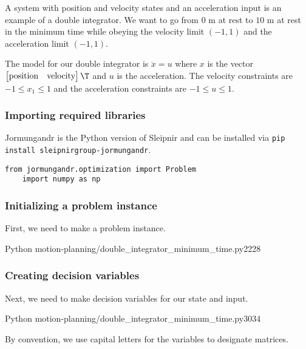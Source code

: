 A system with position and velocity states and an acceleration input is an
example of a double integrator. We want to go from $0$ m at rest to $10$ m at
rest in the minimum time while obeying the velocity limit $(-1, 1)$ and the
acceleration limit $(-1, 1)$.

The model for our double integrator is $\ddot{x} = u$ where $x$ is the vector
$\begin{bmatrix}\text{position} & \text{velocity}\end{bmatrix}\T$ and $u$ is the
acceleration. The velocity constraints are $-1 \leq x_1 \leq 1$ and the
acceleration constraints are $-1 \leq u \leq 1$.

\subsubsection{Importing required libraries}

Jormungandr is the Python version of Sleipnir and can be installed via
\texttt{pip install sleipnirgroup-jormungandr}.
\begin{code}
  \begin{lstlisting}[style=customPython]
    from jormungandr.optimization import Problem
    import numpy as np
  \end{lstlisting}
\end{code}

\subsubsection{Initializing a problem instance}

First, we need to make a problem instance.
\begin{coderemotesubset}{Python}
  {motion-planning/double_integrator_minimum_time.py}{22}{28}
\end{coderemotesubset}

\subsubsection{Creating decision variables}

Next, we need to make decision variables for our state and input.
\begin{coderemotesubset}{Python}
  {motion-planning/double_integrator_minimum_time.py}{30}{34}
\end{coderemotesubset}

By convention, we use capital letters for the variables to designate
matrices.

